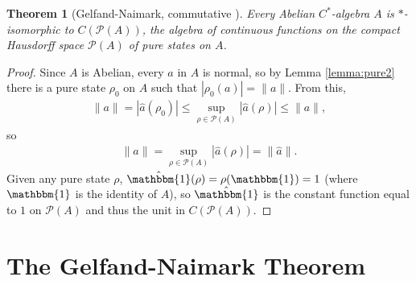 \documentclass[12pt,a4paper]{report}
\theoremstyle{plain}
\newtheorem{thm}{Theorem}
\theoremstyle{definition}
\newcommand{\1}{\mathbbm{1}}
\renewcommand{\P}[1]{\mathscr{P}(#1)}
\begin{document}
\begin{thm}[{Gelfand-Naimark, commutative \cite[4.4.3]{kadison83}}] \label{thm:gnc}
	Every Abelian $C^\ast$-algebra $A$ is $\ast$-isomorphic to $C(\P A)$, the algebra of continuous
	functions on the compact Hausdorff space $\P A$ of pure states on $A$.
\end{thm}
\begin{proof}
	Since $A$ is Abelian, every $a$ in $A$ is normal, so by Lemma \ref{lemma:pure2} there is a pure 
	state $\rho_0$ on $A$ such that $|\rho_0(a)|=\|a\|$. From this, 
	\begin{align*}
		\|a\|=|\hat a(\rho_0)|\leq \sup_{\rho\in\P A}|\hat a(\rho)|\leq\|a\|,
	\end{align*}
	so 
	\begin{align*}
		\|a\|=\sup_{\rho\in\P A} |\hat a (\rho)| = \|\hat a\|.
	\end{align*}
	Given any pure state $\rho$, $\hat \1(\rho) = \rho(\1) = 1$ (where $\1$ is the identity of $A$), so
	$\hat\1$ is the constant function equal to $1$ on $\P A$ and thus the unit in $C(\P A)$.
\end{proof}%

	
\section{The Gelfand-Naimark Theorem}
\end{document}

